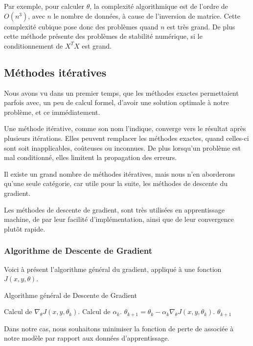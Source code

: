 \documentclass[a4paper, 10pt]{report}
\begin{document}
Par exemple, pour calculer $\theta$, la complexité algorithmique est de l'ordre de $O(n^3)$, avec $n$ le nombre de données, à cause de l'inversion de matrice.
Cette complexité cubique pose donc des problèmes quand $n$ est très grand.
De plus cette méthode présente des problèmes de stabilité numérique, si le conditionnement de $X^TX$ est grand.
		
\subsection{Méthodes itératives}
Nous avons vu dans un premier temps, que les méthodes exactes permettaient parfois avec, un peu de calcul formel, d'avoir une solution optimale à notre problème, et ce immédiatement.

Une méthode itérative, comme son nom l'indique, converge vers le résultat après plusieurs itérations.
Elles peuvent remplacer les méthodes exactes, quand celles-ci sont soit inapplicables, coûteuses ou inconnues. De plus lorsqu'un problème est mal conditionné, elles limitent la propagation des erreurs.

Il existe un grand nombre de méthodes itératives, mais nous n'en aborderons qu'une seule catégorie, car utile pour la suite, les méthodes de descente du gradient.

Les méthodes de descente de gradient, sont très utilisées en apprentissage machine, de par leur facilité d'implémentation, ainsi que de leur convergence plutôt rapide.
\subsubsection{Algorithme de Descente de Gradient}
Voici à présent l'algorithme général du gradient, appliqué à une fonction $J(x,y,\theta)$.
\begin{algorithm}[H]
	\caption{Algorithme général de Descente de Gradient}
	\begin{algorithmic}
		\REPEAT
		\STATE Calcul de $\nabla_\theta J(x,y,\theta_k)$.
		\STATE Calcul de $\alpha_k$.
		\STATE $\theta_{k+1} = \theta_k - \alpha_k \nabla_\theta J(x,y,\theta_k)$.
		\RETURN $\theta_{k+1}$
	\end{algorithmic}
\end{algorithm}
Dans notre cas, nous souhaitons minimiser la fonction de perte de associée à notre modèle par rapport aux données d'apprentissage.
\end{document}
